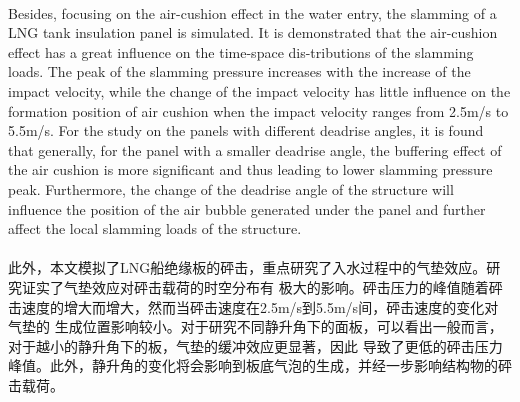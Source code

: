 \documentclass[UTF8]{ctexart}
\begin{document}
\paragraph{\quad}Besides, focusing on the air-cushion effect in the water entry, the slamming of a LNG tank 
                insulation panel is simulated. It is demonstrated that the air-cushion effect has a great 
                influence on the time-space dis-tributions of the slamming loads. The peak of the slamming 
                pressure increases with the increase of the impact velocity, while the change of the impact 
                velocity has little influence on the formation position of air cushion when the impact velocity 
                ranges from 2.5m/s to 5.5m/s. For the study on the panels with different deadrise angles, it is 
                found that generally, for the panel with a smaller deadrise angle, the buffering effect of the 
                air cushion is more significant and thus leading to lower slamming pressure peak. Furthermore, 
                the change of the deadrise angle of the structure will influence the position of the air bubble 
                generated under the panel and further affect the local slamming loads of the structure.
\paragraph{\quad}此外，本文模拟了LNG船绝缘板的砰击，重点研究了入水过程中的气垫效应。研究证实了气垫效应对砰击载荷的时空分布有
                极大的影响。砰击压力的峰值随着砰击速度的增大而增大，然而当砰击速度在2.5m/s到5.5m/s间，砰击速度的变化对气垫的
                生成位置影响较小。对于研究不同静升角下的面板，可以看出一般而言，对于越小的静升角下的板，气垫的缓冲效应更显著，因此
                导致了更低的砰击压力峰值。此外，静升角的变化将会影响到板底气泡的生成，并经一步影响结构物的砰击载荷。
\end{document}
